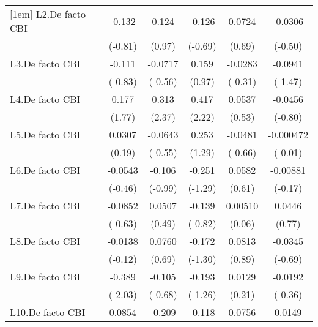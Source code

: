 {\begin{longtable}{l*{5}{c}}
[1em]
L2.De facto CBI &   -0.132         &    0.124         &   -0.126         &   0.0724         &  -0.0306         \\
                &  (-0.81)         &   (0.97)         &  (-0.69)         &   (0.69)         &  (-0.50)         \\
[1em]
L3.De facto CBI &   -0.111         &  -0.0717         &    0.159         &  -0.0283         &  -0.0941         \\
                &  (-0.83)         &  (-0.56)         &   (0.97)         &  (-0.31)         &  (-1.47)         \\
[1em]
L4.De facto CBI &    0.177         &    0.313\sym{*}  &    0.417\sym{*}  &   0.0537         &  -0.0456         \\
                &   (1.77)         &   (2.37)         &   (2.22)         &   (0.53)         &  (-0.80)         \\
[1em]
L5.De facto CBI &   0.0307         &  -0.0643         &    0.253         &  -0.0481         &-0.000472         \\
                &   (0.19)         &  (-0.55)         &   (1.29)         &  (-0.66)         &  (-0.01)         \\
[1em]
L6.De facto CBI &  -0.0543         &   -0.106         &   -0.251         &   0.0582         & -0.00881         \\
                &  (-0.46)         &  (-0.99)         &  (-1.29)         &   (0.61)         &  (-0.17)         \\
[1em]
L7.De facto CBI &  -0.0852         &   0.0507         &   -0.139         &  0.00510         &   0.0446         \\
                &  (-0.63)         &   (0.49)         &  (-0.82)         &   (0.06)         &   (0.77)         \\
[1em]
L8.De facto CBI &  -0.0138         &   0.0760         &   -0.172         &   0.0813         &  -0.0345         \\
                &  (-0.12)         &   (0.69)         &  (-1.30)         &   (0.89)         &  (-0.69)         \\
[1em]
L9.De facto CBI &   -0.389\sym{*}  &   -0.105         &   -0.193         &   0.0129         &  -0.0192         \\
                &  (-2.03)         &  (-0.68)         &  (-1.26)         &   (0.21)         &  (-0.36)         \\
[1em]
L10.De facto CBI&   0.0854         &   -0.209         &   -0.118         &   0.0756         &   0.0149         \\

\end{longtable}}
